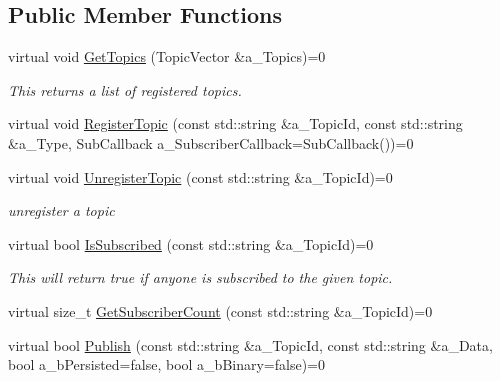 \subsection*{Public Member Functions}
\begin{DoxyCompactItemize}
\item 
\mbox{\label{class_i_topics_a430968c1f5aa9ab82e3013fc07322520}} 
virtual void \hyperlink{class_i_topics_a430968c1f5aa9ab82e3013fc07322520}{Get\+Topics} (Topic\+Vector \&a\+\_\+\+Topics)=0
\begin{DoxyCompactList}\small\item\em This returns a list of registered topics. \end{DoxyCompactList}\item 
virtual void \hyperlink{class_i_topics_aaef29cbe6b8c089b22689a4ece3f711a}{Register\+Topic} (const std\+::string \&a\+\_\+\+Topic\+Id, const std\+::string \&a\+\_\+\+Type, Sub\+Callback a\+\_\+\+Subscriber\+Callback=Sub\+Callback())=0
\item 
\mbox{\label{class_i_topics_ade655da69095758d398329c9a557e954}} 
virtual void \hyperlink{class_i_topics_ade655da69095758d398329c9a557e954}{Unregister\+Topic} (const std\+::string \&a\+\_\+\+Topic\+Id)=0
\begin{DoxyCompactList}\small\item\em unregister a topic \end{DoxyCompactList}\item 
\mbox{\label{class_i_topics_ac78125a64b65b178ee8d0260bd0a77ac}} 
virtual bool \hyperlink{class_i_topics_ac78125a64b65b178ee8d0260bd0a77ac}{Is\+Subscribed} (const std\+::string \&a\+\_\+\+Topic\+Id)=0
\begin{DoxyCompactList}\small\item\em This will return true if anyone is subscribed to the given topic. \end{DoxyCompactList}\item 
virtual size\+\_\+t \hyperlink{class_i_topics_a5e49b50568c300e2f3a182942a3c316d}{Get\+Subscriber\+Count} (const std\+::string \&a\+\_\+\+Topic\+Id)=0
\item 
\mbox{\label{class_i_topics_a1db328f00616a035e1f9fad6817bba29}} 
virtual bool \hyperlink{class_i_topics_a1db328f00616a035e1f9fad6817bba29}{Publish} (const std\+::string \&a\+\_\+\+Topic\+Id, const std\+::string \&a\+\_\+\+Data, bool a\+\_\+b\+Persisted=false, bool a\+\_\+b\+Binary=false)=0

\end{DoxyCompactItemize}
